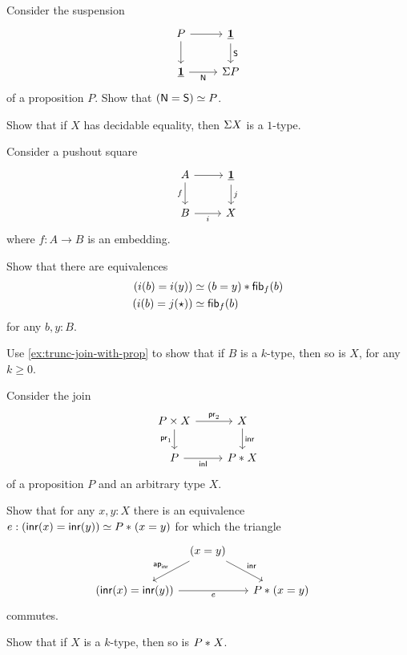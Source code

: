 \begin{exercises}
\item Consider the suspension
  \begin{equation*}
    \begin{tikzcd}
      P \arrow[r] \arrow[d] & \unit \arrow[d,"\south"] \\
      \unit \arrow[r,swap,"\north"] & \susp{P}
    \end{tikzcd}
  \end{equation*}
  of a proposition $P$. Show that $(\mathsf{N}=\mathsf{S})\simeq P$. 
\item Show that if $X$ has decidable equality, then $\Sigma{X}$ is a $1$-type.
\item Consider a pushout square
  \begin{equation*}
    \begin{tikzcd}
      A \arrow[r] \arrow[d,swap,"f"] & \unit \arrow[d,"j"] \\
      B \arrow[r,swap,"i"] & X
    \end{tikzcd}
  \end{equation*}
  where $f:A\to B$ is an embedding.
  \begin{subexenum}
  \item Show that there are equivalences
  \begin{align*}
    (i(b)=i(y)) & \simeq (b=y)\ast \mathsf{fib}_{f}(b) \\
    (i(b)=j(\star)) & \simeq \mathsf{fib}_{f}(b)
  \end{align*}
  for any $b,y:B$.
  \item Use \cref{ex:trunc-join-with-prop} to show that if $B$ is a $k$-type, then so is $X$, for any $k\geq 0$.
  \end{subexenum}
\item Consider the join
  \begin{equation*}
    \begin{tikzcd}
      P \times X \arrow[r,"\proj 2"] \arrow[d,swap,"\proj 1"] & X \arrow[d,"\inr"] \\
      P \arrow[r,swap,"\inl"] & \join{P}{X}
    \end{tikzcd}
  \end{equation*}
  of a proposition $P$ and an arbitrary type $X$.
  \begin{subexenum}
  \item Show that for any $x,y:X$ there is an equivalence
    $e:({\mathsf{inr}}(x)={\mathsf{inr}}(y))\simeq {P}\ast_{}{(x=y)}$ for which the triangle
  \begin{equation*}
    \begin{tikzcd}[column sep=tiny]
      \phantom{\join{P}{(x=y)}} & (x=y) \arrow[dl,swap,"\apfunc{\inr}"] \arrow[dr,"\inr"] & \phantom{(\inr(x)=\inr(y))} \\
      (\inr(x)=\inr(y)) \arrow[rr,swap,"e"] & & \join{P}{(x=y)}
    \end{tikzcd}
  \end{equation*}
  commutes.
\item \label{ex:trunc-join-with-prop}Show that if $X$ is a $k$-type, then so is ${P}\ast_{}{X}$.
  \end{subexenum}
\end{exercises}
